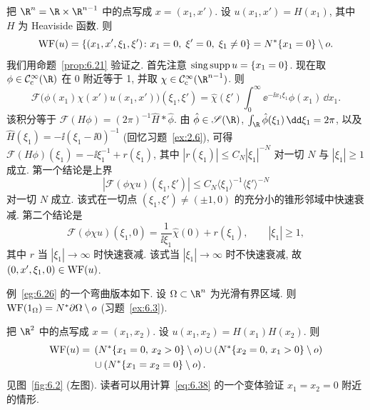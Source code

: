 \begin{example}[半空间的特征函数]\label{eg:6.26}
把 $\R^n = \R \times \R^{n-1}$ 中的点写成 $x = (x_1, x')$. 设 $u(x_1, x') = H(x_1)$, 其中 $H$ 为 Heaviside 函数. 则
\begin{equation}\label{eq:6.37}
    \operatorname{WF}(u) = \{(x_1, x', \xi_1, \xi') \colon x_1 = 0, \; \xi' = 0, \; \xi_1 \neq 0\} = N^* \{x_1 = 0\} \setminus o.
\end{equation}
我们用命题~\ref{prop:6.21} 验证之. 首先注意 $\operatorname{sing\,supp} u = \{x_1 = 0\}$. 现在取 $\phi \in \SmoothComp(\R)$ 在 0 附近等于 1, 并取 $\chi \in \SmoothComp(\R^{n-1})$. 则
\begin{equation}\label{eq:6.38}
    \mathcal{F}\big( \phi(x_1) \chi(x') u(x_1, x') \big)(\xi_1, \xi') = \hat{\chi}(\xi') \int_0^\infty \ee^{-\ii x_1 \xi_1} \phi(x_1) \,\dd x_1.
\end{equation}
该积分等于 $\mathcal{F}(H\phi) = (2\pi)^{-1} \hat{H} * \hat{\phi}$. 由 $\hat{\phi} \in \mathscr{S}(\R)$, $\int_{\R} \hat{\phi}(\xi_1) \,\dd\xi_1 = 2\pi$, 以及 $\hat{H}(\xi_1) = -\ii(\xi_1 - \ii 0)^{-1}$ (回忆习题~\ref{ex:2.6}), 可得
$\mathcal{F}(H\phi)(\xi_1) = -\ii \xi_1^{-1} + r(\xi_1)$, 其中 $|r(\xi_1)| \le C_N |\xi_1|^{-N}$ 对一切 $N$ 与 $|\xi_1| \ge 1$ 成立. 第一个结论是上界
\begin{equation}\label{eq:6.39}
    |\mathcal{F}(\phi\chi u)(\xi_1, \xi')| \le C_N \langle \xi_1 \rangle^{-1} \langle \xi' \rangle^{-N}
\end{equation}
对一切 $N$ 成立. 该式在一切点 $(\xi_1, \xi') \neq (\pm 1, 0)$ 的充分小的锥形邻域中快速衰减. 第二个结论是
\begin{equation}\label{eq:6.40}
    \mathcal{F}(\phi\chi u)(\xi_1, 0) = \frac{1}{\ii \xi_1} \hat{\chi}(0) + r(\xi_1), \qquad |\xi_1| \ge 1,
\end{equation}
其中 $r$ 当 $|\xi_1| \to \infty$ 时快速衰减. 该式当 $|\xi_1| \to \infty$ 时不快速衰减, 故 $(0, x', \xi_1, 0) \in \operatorname{WF}(u)$.
\end{example}

\begin{example}[光滑区域的特征函数]\label{eg:6.27}
例~\ref{eg:6.26} 的一个弯曲版本如下. 设 $\Omega \subset \R^n$ 为光滑有界区域. 则
$\operatorname{WF}(1_\Omega) = N^* \partial\Omega \setminus o$ (习题~\ref{ex:6.3}).
\end{example}

\begin{example}[带角区域的特征函数]\label{eg:6.28}
把 $\R^2$ 中的点写成 $x = (x_1, x_2)$. 设 $u(x_1, x_2) = H(x_1) H(x_2)$. 则
\begin{equation}\label{eq:6.41}
\begin{split}
    \operatorname{WF}(u) ={} & \left( N^* \{x_1 = 0, \, x_2 > 0\} \setminus o \right) \cup \left( N^* \{x_2 = 0, \, x_1 > 0\} \setminus o \right) \\
    & \cup \left( N^* \{x_1 = x_2 = 0\} \setminus o \right).
\end{split}
\end{equation}
见图~\ref{fig:6.2} (左图). 读者可以用计算~\eqref{eq:6.38} 的一个变体验证 $x_1 = x_2 = 0$ 附近的情形.
\end{example}

